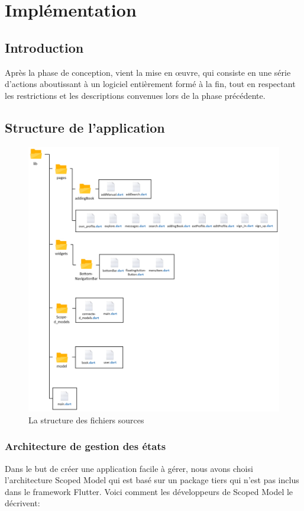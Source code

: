 \newpage

\section{Implémentation}
\subsection{Introduction}
Après la phase de conception, vient la mise en œuvre, qui consiste en une série d’actions aboutissant à un logiciel entièrement formé à la fin, tout en respectant les restrictions et les descriptions convenues lors de la phase précédente.

\subsection{Structure de l'application}

\begin{figure}[H]
	\centering
		\includegraphics[width=13cm]{Images/chapter3/software_architecture.png}
		\caption{{\footnotesize La structure des fichiers sources}}
\end{figure}

\newpage

\subsubsection{Architecture de gestion des états}
Dans le but de créer une application facile à gérer, nous avons choisi l’architecture Scoped Model qui est basé sur un package tiers qui n'est pas inclus dans le framework Flutter. Voici comment les développeurs de Scoped Model le décrivent:

